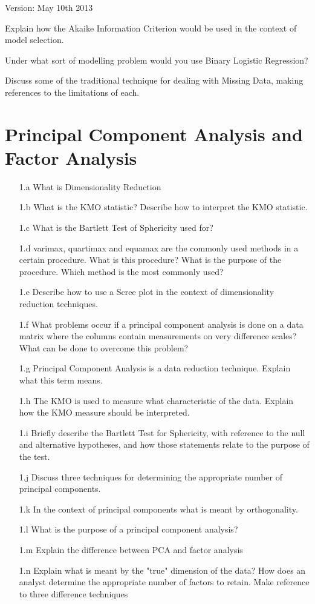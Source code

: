 \documentclass[a4paper,12pt]{article}
\begin{document}
Version: May 10th 2013




Explain how the Akaike Information Criterion would be used in the context of model selection.




Under what sort of modelling problem would you use Binary Logistic Regression?

Discuss some of the traditional technique for dealing with Missing Data, making references to the limitations of each.
\section*{Principal Component Analysis and Factor Analysis}
\begin{itemize}
\item[1.a] What is Dimensionality Reduction
\item[1.b] What is the KMO statistic? Describe how to interpret the KMO statistic.
\item[1.c] What is the Bartlett Test of Sphericity used for?
\item[1.d] varimax, quartimax and equamax are the commonly used methods in a certain procedure. What is this procedure? What is the purpose of the procedure.
Which method is the most commonly used?
\item[1.e] Describe how to use a Scree plot in the context of dimensionality reduction techniques.
\item[1.f] What problems occur if a principal component analysis is done on a data matrix where the columns contain measurements on very difference scales?  What can be done to overcome this problem?
\item[1.g] Principal Component Analysis is a data reduction technique. Explain what this term
means.
\item[1.h] The KMO is used to measure what characteristic of the data. Explain how the KMO
measure should be interpreted.
\item[1.i] Briefly describe the Bartlett Test for Sphericity, with reference to the null and alternative
hypotheses, and how those statements relate to the purpose of the test.
\item[1.j] Discuss three techniques for determining the appropriate number of principal components.
\item[1.k] In the context of principal components what is meant by orthogonality.

\item[1.l] What is the purpose of a principal component analysis?
\item[1.m] Explain the difference between PCA and factor analysis
\item[1.n] Explain what is meant by the "true" dimension of the data? How does an analyst determine the appropriate number of factors to retain. Make reference to three difference techniques
\end{itemize}
\end{document}
